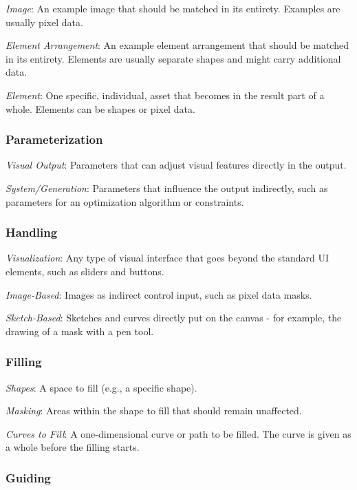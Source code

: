 \textit{Image}: An example image that should be matched in its entirety. Examples are usually pixel data.

\textit{Element Arrangement}: An example element arrangement that should be matched in its entirety. Elements are usually separate shapes and might carry additional data.

\textit{Element}: One specific, individual, asset that becomes in the result part of a whole. Elements can be shapes or pixel data.


\subsubsection{Parameterization}


\textit{Visual Output}: Parameters that can adjust visual features directly in the output.

\textit{System/Generation}: Parameters that influence the output indirectly, such as parameters for an optimization algorithm or constraints.


\subsubsection{Handling}


\textit{Visualization}: Any type of visual interface that goes beyond the standard UI elements, such as sliders and buttons.

\textit{Image-Based}: Images as indirect control input, such as pixel data masks.

\textit{Sketch-Based}: Sketches and curves directly put on the canvas - for example, the drawing of a mask with a pen tool.


\subsubsection{Filling}


\textit{Shapes}: A space to fill (e.g., a specific shape).

\textit{Masking}: Areas within the shape to fill that should remain unaffected.

\textit{Curves to Fill}: A one-dimensional curve or path to be filled. The curve is given as a whole before the filling starts.


\subsubsection{Guiding}


